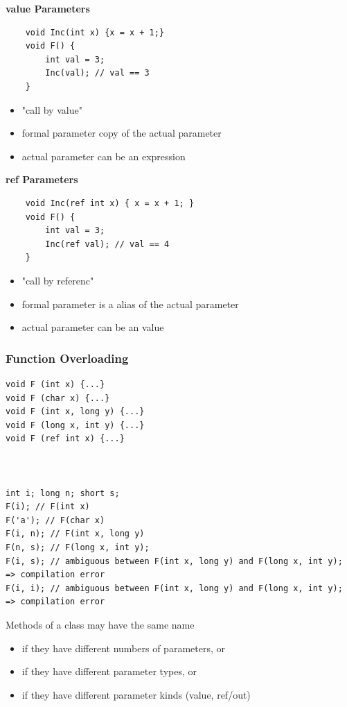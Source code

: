 \textbf{value Parameters}
\begin{multicols}{2}
	\begin{lstlisting}
	void Inc(int x) {x = x + 1;}
	void F() {
		int val = 3;
		Inc(val); // val == 3
	}
	\end{lstlisting}
	\columnbreak
	\begin{itemize}
		\item "call by value"
		\item formal parameter copy of the actual parameter
		\item actual parameter can be an expression
	\end{itemize}
\end{multicols}

\textbf{ref Parameters}
\begin{multicols}{2}
	\begin{lstlisting}
	void Inc(ref int x) { x = x + 1; }
	void F() {
		int val = 3;
		Inc(ref val); // val == 4
	}
	\end{lstlisting}
	\columnbreak
	\begin{itemize}
		\item "call by referenc"
		\item formal parameter is a alias of the actual parameter
		\item actual parameter can be an value
	\end{itemize}
\end{multicols}


\subsubsection{Function Overloading}
\begin{multicols}{2}
\begin{lstlisting}
void F (int x) {...}
void F (char x) {...}
void F (int x, long y) {...}
void F (long x, int y) {...}
void F (ref int x) {...}



int i; long n; short s;
F(i); // F(int x)
F('a'); // F(char x)
F(i, n); // F(int x, long y)
F(n, s); // F(long x, int y);
F(i, s); // ambiguous between F(int x, long y) and F(long x, int y); => compilation error
F(i, i); // ambiguous between F(int x, long y) and F(long x, int y); => compilation error
\end{lstlisting}
	\columnbreak
	Methods of a class may have the same name
	\begin{itemize}
		\item if they have different numbers of parameters, or
		\item if they have different parameter types, or
		\item if they have different parameter kinds (value, ref/out)
	\end{itemize}
\end{multicols}

